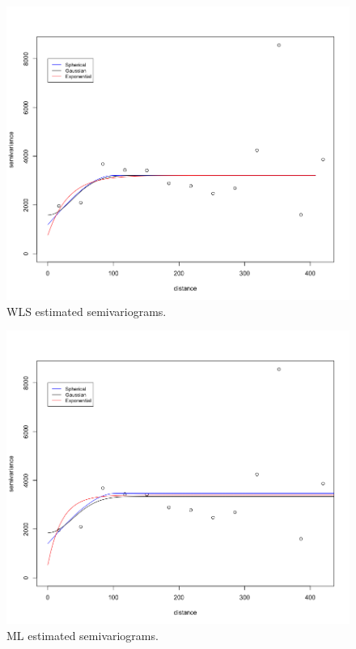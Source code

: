 \documentclass[12pt]{article}
\makeatletter
\theoremstyle{homework}
\newenvironment{exercise}[1]
{\def\@currentlabel{#1}\exercisecore}
{\endexercisecore}
\makeatother
\begin{document}
\begin{exercise}{2}
\begin{figure}[H]
  \begin{center}
    \caption{WLS estimated semivariograms.}
  \includegraphics[width = \textwidth]{Rplot04.png}
  \end{center}
\end{figure}
\begin{figure}[H]
  \begin{center}
    \caption{ML estimated semivariograms.}
  \includegraphics[width = \textwidth]{Rplot05.png}

\end{center}
\end{figure}
\end{exercise}
\end{document}
